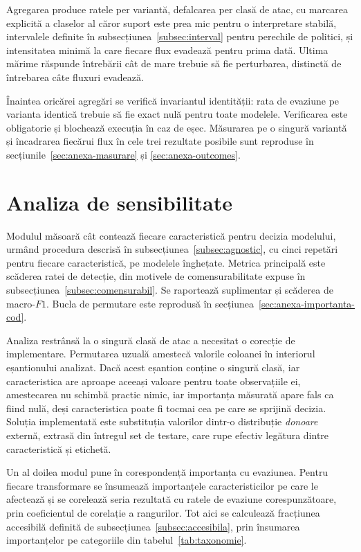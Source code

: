 Agregarea produce ratele per variantă, defalcarea per clasă de atac, cu marcarea explicită a claselor al căror suport este prea mic pentru o interpretare stabilă, intervalele definite în subsecțiunea~\ref{subsec:interval} pentru perechile de politici, și intensitatea minimă la care fiecare flux evadează pentru prima dată. Ultima mărime răspunde întrebării cât de mare trebuie să fie perturbarea, distinctă de întrebarea câte fluxuri evadează.

Înaintea oricărei agregări se verifică invariantul identității: rata de evaziune pe varianta identică trebuie să fie exact nulă pentru toate modelele. Verificarea este obligatorie și blochează execuția în caz de eșec. Măsurarea pe o singură variantă și încadrarea fiecărui flux în cele trei rezultate posibile sunt reproduse în secțiunile~\ref{sec:anexa-masurare} și \ref{sec:anexa-outcomes}.

\section{Analiza de sensibilitate}\label{sec:implsensibilitate}

Modulul măsoară cât contează fiecare caracteristică pentru decizia modelului, urmând procedura descrisă în subsecțiunea~\ref{subsec:agnostic}, cu cinci repetări pentru fiecare caracteristică, pe modelele înghețate. Metrica principală este scăderea ratei de detecție, din motivele de comensurabilitate expuse în subsecțiunea~\ref{subsec:comensurabil}. Se raportează suplimentar și scăderea de macro-$F1$. Bucla de permutare este reprodusă în secțiunea~\ref{sec:anexa-importanta-cod}.

Analiza restrânsă la o singură clasă de atac a necesitat o corecție de implementare. Permutarea uzuală amestecă valorile coloanei în interiorul eșantionului analizat. Dacă acest eșantion conține o singură clasă, iar caracteristica are aproape aceeași valoare pentru toate observațiile ei, amestecarea nu schimbă practic nimic, iar importanța măsurată apare fals ca fiind nulă, deși caracteristica poate fi tocmai cea pe care se sprijină decizia. Soluția implementată este substituția valorilor dintr-o distribuție \emph{donoare} externă, extrasă din întregul set de testare, care rupe efectiv legătura dintre caracteristică și etichetă.

Un al doilea modul pune în corespondență importanța cu evaziunea. Pentru fiecare transformare se însumează importanțele caracteristicilor pe care le afectează și se corelează seria rezultată cu ratele de evaziune corespunzătoare, prin coeficientul de corelație a rangurilor. Tot aici se calculează fracțiunea accesibilă definită de subsecțiunea~\ref{subsec:accesibila}, prin însumarea importanțelor pe categoriile din tabelul~\ref{tab:taxonomie}.

